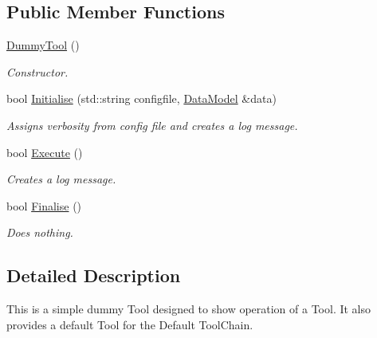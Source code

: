 \subsection*{Public Member Functions}
\begin{DoxyCompactItemize}
\item 
\hypertarget{classDummyTool_a33914471b4de346168aa92b5febb6f9c}{\hyperlink{classDummyTool_a33914471b4de346168aa92b5febb6f9c}{Dummy\-Tool} ()}\label{classDummyTool_a33914471b4de346168aa92b5febb6f9c}

\begin{DoxyCompactList}\small\item\em Constructor. \end{DoxyCompactList}\item 
\hypertarget{classDummyTool_a0d9cd781681a06ee3cf0cd1e7bb770a8}{bool \hyperlink{classDummyTool_a0d9cd781681a06ee3cf0cd1e7bb770a8}{Initialise} (std\-::string configfile, \hyperlink{classDataModel}{Data\-Model} \&data)}\label{classDummyTool_a0d9cd781681a06ee3cf0cd1e7bb770a8}

\begin{DoxyCompactList}\small\item\em Assigns verbosity from config file and creates a log message. \end{DoxyCompactList}\item 
\hypertarget{classDummyTool_ac107b31f1785c1cc803e0e65be548047}{bool \hyperlink{classDummyTool_ac107b31f1785c1cc803e0e65be548047}{Execute} ()}\label{classDummyTool_ac107b31f1785c1cc803e0e65be548047}

\begin{DoxyCompactList}\small\item\em Creates a log message. \end{DoxyCompactList}\item 
\hypertarget{classDummyTool_aacb5d0b9906a27c2b4bba4aae9bc093a}{bool \hyperlink{classDummyTool_aacb5d0b9906a27c2b4bba4aae9bc093a}{Finalise} ()}\label{classDummyTool_aacb5d0b9906a27c2b4bba4aae9bc093a}

\begin{DoxyCompactList}\small\item\em Does nothing. \end{DoxyCompactList}\end{DoxyCompactItemize}


\subsection{Detailed Description}
This is a simple dummy Tool designed to show operation of a Tool. It also provides a default Tool for the Default Tool\-Chain.

